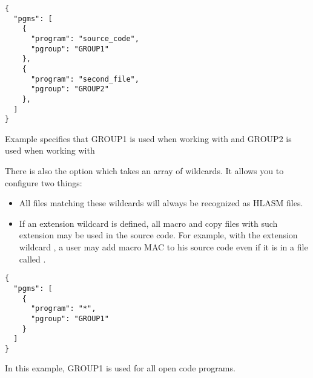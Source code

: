 \begin{listing}
	\begin{verbatim}
{
  "pgms": [
    {
      "program": "source_code",
      "pgroup": "GROUP1"
    },
    {
      "program": "second_file",
      "pgroup": "GROUP2"
    },
  ]
}
	\end{verbatim}
	\caption{Example  specifies that GROUP1 is used when working with  and GROUP2 is used when working with }
	\label{lst:grps}
\end{listing}

There is also the option  which takes an array of wildcards. It allows you to configure two things:
\begin{itemize}
	\item All files matching these wildcards will always be recognized as HLASM files. 
	\item If an extension wildcard is defined, all macro and copy files with such extension may be used in the source code. For example, with the extension wildcard , a user may add macro MAC to his source code even if it is in a file called .
\end{itemize}

\begin{listing}[H]
	\begin{verbatim}
{
  "pgms": [
    {
      "program": "*",
      "pgroup": "GROUP1"  
    }
  ]
}
	\end{verbatim}
	\caption{In this example, GROUP1 is used for all open code programs.}
\end{listing}
